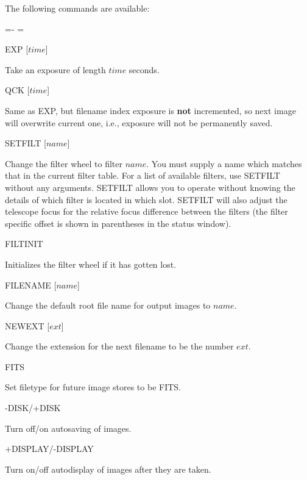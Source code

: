 \documentclass[10pt]{report}
\newenvironment{hanging}{
	\begin{list}{}{
		\labelsep=0pt
		\labelwidth=0pt
		\listparindent=0pt
		\itemindent=-\leftmargini
		\leftmargin=\leftmargini
	}
}{
	\end{list}
}
\begin{document}
The following commands are available:
\begin{hanging}
\item{EXP [$time$]}

Take an exposure of length $time$ seconds.

\item{QCK [$time$]}

Same as EXP, but filename index exposure is \textbf{not} incremented, so 
next image will overwrite current one, i.e., exposure will not be 
permanently saved.

\item{SETFILT [$name$]}

Change the filter wheel to filter $name$. You must supply a name which
matches that in the current filter table. For a list of available filters,
use SETFILT without any arguments. SETFILT allows you to operate without
knowing the details of which filter is located in which slot. 
SETFILT will also adjust the telescope focus for the relative focus
difference between the filters (the filter specific offset is shown in
parentheses in the status window).

\item{FILTINIT}

Initializes the filter wheel if it has gotten lost.

\item{FILENAME [$name$]}

Change the default root file name for output images to $name$.

\item{NEWEXT [$ext$]}

Change the extension for the next filename to be the number $ext$.

\item{FITS}

Set filetype for future image stores to be FITS.

\item{-DISK/+DISK}

Turn off/on autosaving of images. 

\item{+DISPLAY/-DISPLAY}

Turn on/off autodisplay of images after they are taken.

%


\end{hanging}
\end{document}
